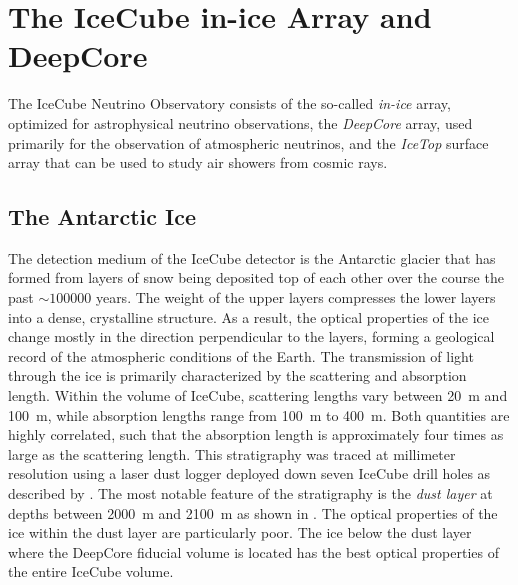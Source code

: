 \section{The IceCube in-ice Array and DeepCore}

The IceCube Neutrino Observatory consists of the so-called \emph{in-ice} array, optimized for astrophysical neutrino observations, the \emph{DeepCore} array, used primarily for the observation of atmospheric neutrinos, and the \emph{IceTop} surface array that can be used to study air showers from cosmic rays.

\subsection{The Antarctic Ice}

The detection medium of the IceCube detector is the Antarctic glacier that has formed from layers of snow being deposited top of each other over the course the past $\sim\num{100000}$ years.
The weight of the upper layers compresses the lower layers into a dense, crystalline structure.
As a result, the optical properties of the ice change mostly in the direction perpendicular to the layers, forming a geological record of the atmospheric conditions of the Earth.
The transmission of light through the ice is primarily characterized by the scattering and absorption length. Within the volume of IceCube, scattering lengths vary between \SI{20}{\meter} and \SI{100}{\meter}, while absorption lengths range from \SI{100}{\meter} to \SI{400}{\meter}. Both quantities are highly correlated, such that the absorption length is approximately four times as large as the scattering length.
This stratigraphy was traced at millimeter resolution using a laser dust logger deployed down seven IceCube drill holes as described by \cite{dustlogger}.
The most notable feature of the stratigraphy is the \emph{dust layer} at depths between 2000~m and 2100~m as shown in .
The optical properties of the ice within the dust layer are particularly poor.
The ice below the dust layer where the DeepCore fiducial volume is located has the best optical properties of the entire IceCube volume.

